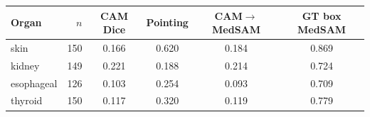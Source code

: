 \begin{tabular}{@{}lrcccc@{}}
\toprule
Organ & $n$ & CAM Dice & Pointing & CAM$\to$MedSAM & GT box MedSAM \\
\midrule
skin & 150 & 0.166 & 0.620 & 0.184 & 0.869 \\
kidney & 149 & 0.221 & 0.188 & 0.214 & 0.724 \\
esophageal & 126 & 0.103 & 0.254 & 0.093 & 0.709 \\
thyroid & 150 & 0.117 & 0.320 & 0.119 & 0.779 \\
\bottomrule
\end{tabular}